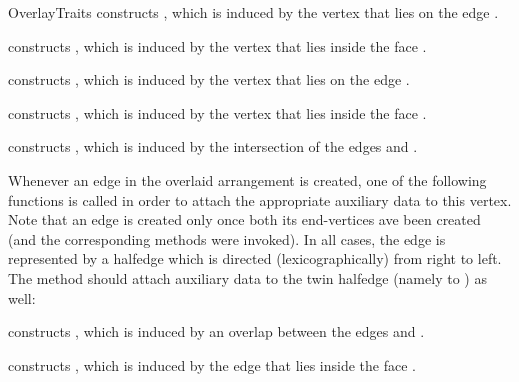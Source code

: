\begin{ccRefConcept}{OverlayTraits}
    {constructs , which is induced by the vertex  that lies on
     the edge .}

    {constructs , which is induced by the vertex  that lies
     inside the face .}

    {constructs , which is induced by the vertex  that lies on
     the edge .}

    {constructs , which is induced by the vertex  that lies
     inside the face .}

    {constructs , which is induced by the intersection of the edges 
      and .}

Whenever an edge in the overlaid arrangement is created, one of the
following functions is called in order to attach the appropriate
auxiliary data to this vertex. Note that an edge is created only once both
its end-vertices ave been created (and the corresponding 
methods were invoked). In all cases, the edge is represented by a halfedge
 which is directed (lexicographically) from right to left. The
 method should attach auxiliary data to the twin halfedge
(namely to ) as well:

    {constructs , which is induced by an overlap between the edges 
      and .}

    {constructs , which is induced by the edge  that lies
     inside the face .}


\end{ccRefConcept}
